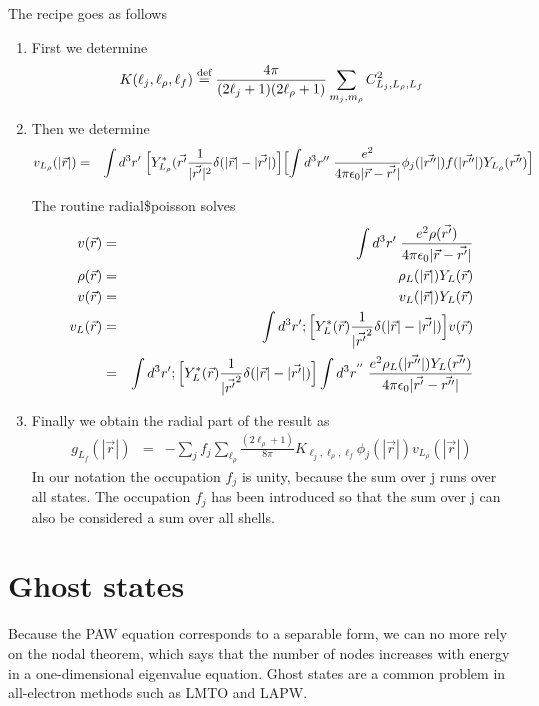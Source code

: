 \documentclass[11pt,a4paper]{report}
\begin{document}
The recipe goes as follows 
\begin{enumerate}
\item First we determine
\begin{eqnarray*}
K(\ell_j,\ell_\rho,\ell_f)\stackrel{\text{def}}{=}
\frac{4\pi}{(2\ell_j+1)(2\ell_\rho+1)}\sum_{m_j,m_\rho}C_{L_j,L_\rho,L_f}^2
\end{eqnarray*}

\item Then we determine
\begin{eqnarray*}
v_{L_\rho}(|\vec{r}|)&=&
\int d^3r'\;\Bigl[Y^*_{L_\rho}(\vec{r'}\frac{1}{|\vec{r'}|^2}\delta(|\vec{r}|-|\vec{r'}|)\Bigr]
\Bigl[\int d^3r''\; \frac{e^2}
{4\pi\epsilon_0|\vec{r}-\vec{r'}|}
\phi_j(|\vec{r''}|)f(|\vec{r''}|)Y_{L_\rho}(\vec{r''})\Bigr]
\end{eqnarray*}

The routine radial\$poisson solves
\begin{eqnarray*}
v(\vec{r})&=&\int d^3r'\;\frac{e^2\rho(\vec{r'})}{4\pi\epsilon_0|\vec{r}-\vec{r'}|}
\\
\rho(\vec{r})&=&\rho_L(|\vec{r}|)Y_L(\vec{r})
\\
v(\vec{r})&=&v_L(|\vec{r}|)Y_L(\vec{r})
\\
v_L(\vec{r})
&=&\int d^3r'; \Bigl[Y^*_L(\vec{r})\frac{1}{|\vec{r'}^2}
\delta(|\vec{r}|-|\vec{r'}|)\Bigr]
v(\vec{r})
\\
&=&\int d^3r'; \Bigl[Y^*_L(\vec{r})\frac{1}{|\vec{r'}^2}
\delta(|\vec{r}|-|\vec{r'}|)\Bigr]
\int d^3r^{''}\;\frac{e^2\rho_L(|\vec{r''}|)Y_L(\vec{r''})}{4\pi\epsilon_0|\vec{r'}-\vec{r''}|}
\end{eqnarray*}

\item Finally we obtain the radial part of the result as
\begin{eqnarray*}
g_{L_f}(|\vec{r}|)&=&-\sum_{j}f_j\sum_{\ell_\rho}
\frac{(2\ell_\rho+1)}{8\pi}K_{\ell_j,\ell_\rho,\ell_f}
\phi_j(|\vec{r}|)v_{L_\rho}(|\vec{r}|)
\end{eqnarray*}
In our notation the
occupation $f_j$ is unity, because the sum over j runs over all
states.  The occupation $f_j$ has been introduced so that the sum over
j can also be considered a sum over all shells.
\end{enumerate}

\section{Ghost states}
Because the PAW equation corresponds to a separable form, we can no
more rely on the nodal theorem, which says that the number of nodes
increases with energy in a one-dimensional eigenvalue equation. Ghost
states are a common problem in all-electron methods such as LMTO and
LAPW.
\end{document}
